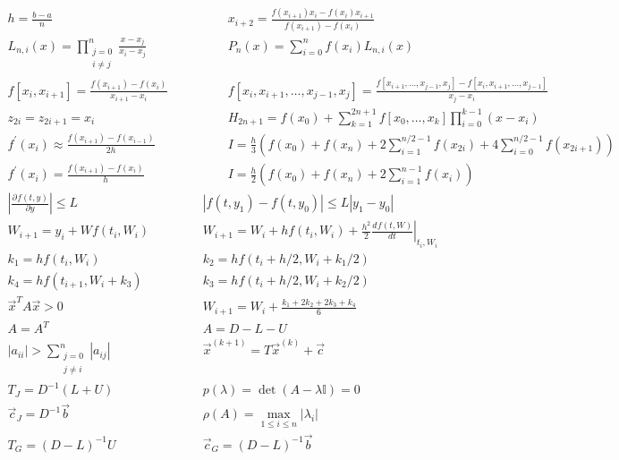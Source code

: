 \documentclass[12pt]{article}
\newcommand{\I}{\ensuremath{\mathbb{I}}}
\newcommand{\diff}[3]{\frac{d^{#3} #1}{d#2^{#3}}}
\newcommand{\pdiff}[3]{\frac{\partial^{#3} #1}{\partial#2^{#3}}}
\newcommand{\abs}[1]{\left| #1 \right|}
\begin{document}
{\large
\[
\begin{array}{cc}
h = \frac{b - a}{n} \qquad & \qquad
x_{i+2} = \frac{f(x_{i+1}){x_i}-f(x_{i}){x_{i+1}}}{f(x_{i+1}) - f(x_i)} \\
L_{n, i}(x) = \prod\limits_{\substack{j=0\\ i \neq j}}^n \frac{x - x_j}{x_i - x_j} \qquad & \qquad
P_n(x) = \sum\limits_{i = 0}^n f(x_i)L_{n,i}(x) \\
f\left[x_i, x_{i+1}\right] = \frac{f(x_{i+1})-f(x_i)}{x_{i+1}-x_i} \qquad & \qquad
f\left[ x_i, x_{i+1}, \ldots, x_{j-1}, x_j\right] = \frac{f\left[x_{i+1}, \ldots, x_{j-1}, x_j\right] - f\left[ x_i, x_{i+1}, \ldots, x_{j-1} \right]}{x_j - x_i} \\
z_{2i} = z_{2i+1} = x_i \qquad & \qquad
H_{2n+1} = f(x_0) + \sum\limits_{k=1}^{2n+1} f\left[x_0, \ldots, x_k\right] \prod\limits_{i = 0}^{k-1}(x-x_i)  \\
f^\prime(x_i) \approx \frac{f(x_{i+1}) - f(x_{i-1})}{2h} \qquad & \qquad
I = \frac{h}{3}\left( f(x_0) + f(x_n) + 2\sum\limits_{i=1}^{n/2-1}f(x_{2i}) + 4\sum\limits_{i=0}^{n/2-1}f(x_{2i+1}) \right) \\
f^\prime(x_i) = \frac{f(x_{i+1})-f(x_i)}{h} \qquad & \qquad
I = \frac{h}{2}\left( f(x_0) + f(x_n) + 2\sum\limits_{i = 1}^{n-1}f(x_i)\right) \\
\abs{\pdiff{f(t,y)}{y}{}} \leq L & \abs{f(t, y_1) -f(t, y_0)} \leq L\abs{y_1 - y_0}\\
W_{i+1} = y_i + W f(t_i,W_i) & W_{i+1} = W_i + h f(t_i,W_i) + \frac{h^2}{2} \left.\diff{f(t,W)}{t}{} \right|_{t_i, W_i} \\
k_1  =  h f(t_i,W_i) & k_2  =  h f(t_i+h/2,W_i + k_1/2) \\
k_4  =  h f(t_{i+1},W_i + k_3) & k_3  =  h f(t_i+h/2,W_i + k_2/2)\\
\vec{x}^TA\vec{x} > 0 & W_{i+1} = W_i + \frac{k_1+2k_2+2k_3+k_4}{6}\\
A = A^T & A = D - L - U\\
|a_{ii}| > \sum\limits_{\substack{j=0\\j\neq i}}^n |a_{ij}| & \vec{x}^{(k+1)} = T\vec{x}^{(k)} + \vec{c}\\
T_J = D^{-1}(L+U) & p(\lambda) = \det(A-\lambda \I) = 0\\
\vec{c}_J = D^{-1}\vec{b} & \rho(A) = \max\limits_{1\leq i\leq n}|\lambda_i|\\
T_G = (D-L)^{-1}U & \vec{c}_G = (D-L)^{-1}\vec{b}
\end{array}
\]
}
\end{document}
